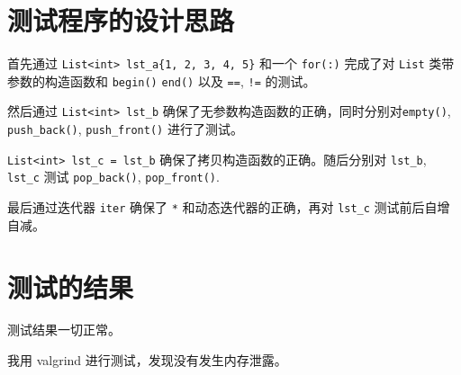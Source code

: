 \documentclass[UTF8]{ctexart}
\begin{document}
\pagestyle{fancy}
\fancyhead{}

\section{测试程序的设计思路}

首先通过 \verb|List<int> lst_a{1, 2, 3, 4, 5}| 和一个 \verb|for(:)| 完成了对 \verb|List| 类带参数的构造函数和 \verb|begin()| \verb|end()| 以及 \verb|==|, \verb|!=| 的测试。

然后通过 \verb|List<int> lst_b| 确保了无参数构造函数的正确，同时分别对\verb|empty()|, \verb|push_back()|, \verb|push_front()| 进行了测试。

\verb|List<int> lst_c = lst_b| 确保了拷贝构造函数的正确。随后分别对 \verb|lst_b|, \verb|lst_c| 测试  \verb|pop_back()|, \verb|pop_front()|. 

最后通过迭代器 \verb|iter| 确保了 \verb|*| 和动态迭代器的正确，再对 \verb|lst_c| 测试前后自增自减。

\section{测试的结果}

测试结果一切正常。

我用 valgrind 进行测试，发现没有发生内存泄露。
\end{document}
